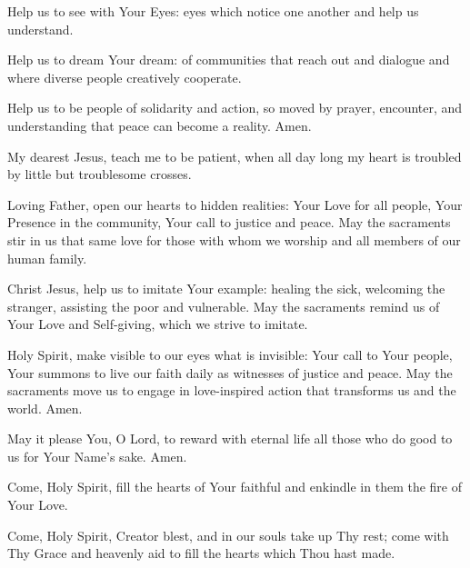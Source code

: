 Help us to see with Your Eyes:
eyes which notice one another and help us understand.

Help us to dream Your dream:
of communities that reach out and dialogue and where diverse people creatively cooperate.

Help us to be people of solidarity and action, so moved by prayer, encounter, and understanding that peace can become a reality.
Amen.

My dearest Jesus, teach me to be patient, when all day long my heart is troubled by little but troublesome crosses.

Loving Father, open our hearts to hidden realities:
Your Love for all people,
Your Presence in the community,
Your call to justice and peace.
May the sacraments stir in us
that same love for those with whom we worship and all members of our human family.

Christ Jesus, help us to imitate Your example:
healing the sick,
welcoming the stranger,
assisting the poor and vulnerable.
May the sacraments remind us
of Your Love and Self-giving,
which we strive to imitate.

Holy Spirit, make visible to our eyes what is invisible:
Your call to Your people,
Your summons to live our faith daily
as witnesses of justice and peace.
May the sacraments move us to engage in love-inspired action that transforms us and the world.
Amen.

May it please You, O Lord, to reward with eternal life all those who do good to us for Your Name's sake. Amen.

Come, Holy Spirit, fill the hearts of Your faithful and enkindle in them the fire of Your Love.

Come, Holy Spirit, Creator blest,
and in our souls take up Thy rest;
come with Thy Grace and heavenly aid
to fill the hearts which Thou hast made.

